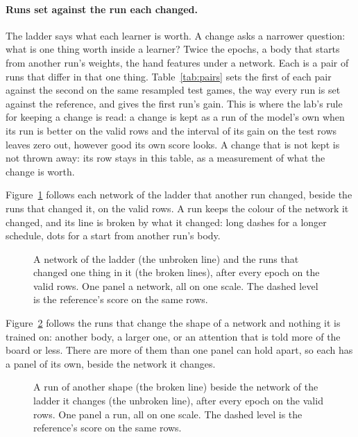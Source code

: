 \ifpairs
\paragraph{Runs set against the run each changed.}
The ladder says what each learner is worth. A change asks a narrower
question: what is one thing worth inside a learner? Twice the epochs, a body
that starts from another run's weights, the hand features under a network.
Each is a pair of runs that differ in that one thing.
Table~\ref{tab:pairs} sets the first of each pair against the second on the
same resampled test games, the way every run is set against the reference,
and gives the first run's gain. This is where the lab's rule for keeping a
change is read: a change is kept as a run of the model's own when its run is
better on the valid rows and the interval of its gain on the test rows
leaves zero out, however good its own score looks. A change that is not kept
is not thrown away: its row stays in this table, as a measurement of what
the change is worth.

\fi

\ifvariants
Figure~\ref{fig:variants} follows each network of the ladder that another
run changed, beside the runs that changed it, on the valid rows. A run keeps
the colour of the network it changed, and its line is broken by what it
changed: long dashes for a longer schedule, dots for a start from another
run's body.

\begin{figure}[htbp]\centering
{}
\caption{A network of the ladder (the unbroken line) and the runs that
changed one thing in it (the broken lines), after every epoch on the valid
rows. One panel a network, all on one scale. The dashed level is the
reference's score on the same rows.}
\label{fig:variants}
\end{figure}
\fi

\ifshapes
Figure~\ref{fig:shapes} follows the runs that change the shape of a network
and nothing it is trained on: another body, a larger one, or an attention
that is told more of the board or less. There are more of them than one
panel can hold apart, so each has a panel of its own, beside the network it
changes.

\begin{figure}[htbp]\centering
{}
\caption{A run of another shape (the broken line) beside the network of the
ladder it changes (the unbroken line), after every epoch on the valid rows.
One panel a run, all on one scale. The dashed level is the reference's score
on the same rows.}
\label{fig:shapes}
\end{figure}
\fi

